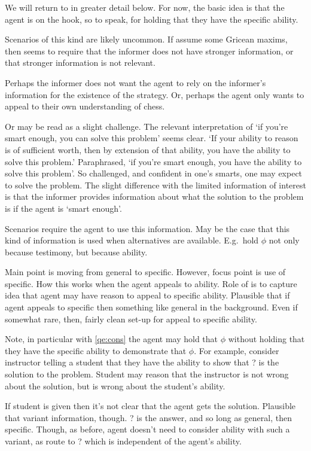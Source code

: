 \begin{note}
  We will return to \GSI in greater detail below.
  For now, the basic idea is that the agent is on the hook, so to speak, for holding that they have the specific ability.

  Scenarios of this kind are likely uncommon.
  If assume some Gricean maxims, then seems to require that the informer does not have stronger information, or that stronger information is not relevant.

  Perhaps the informer does not want the agent to rely on the informer's information for the existence of the strategy.
  Or, perhaps the agent only wants to appeal to their own understanding of chess.

  Or may be read as a slight challenge.
  The relevant interpretation of `if you're smart enough, you can solve this problem' seems clear.
  `If your ability to reason is of sufficient worth, then by extension of that ability, you have the ability to solve this problem.'
  Paraphrased, `if you're smart enough, you have the ability to solve this problem'.
  So challenged, and confident in one's smarts, one may expect to solve the problem.
  The slight difference with the limited information of interest is that the informer provides information about what the solution to the problem is if the agent is `smart enough'.

  Scenarios require the agent to use this information.
  May be the case that this kind of information is used when alternatives are available.
  E.g.\ hold \(\phi\) not only because testimony, but because ability.

  Main point is moving from general to specific.
  However, focus point is use of specific.
  How this works when the agent appeals to ability.
  Role of \GSI{} is to capture idea that agent may have reason to appeal to specific ability.
  Plausible that if agent appeals to specific then something like general in the background.
  Even if somewhat rare, then, fairly clean set-up for appeal to specific ability.

  Note, in particular with \ref{qe:cons} the agent may hold that \(\phi\) without holding that they have the specific ability to demonstrate that \(\phi\).
  For example, consider instructor telling a student that they have the ability to show that ? is the solution to the problem.
  Student may reason that the instructor is not wrong about the solution, but is wrong about the student's ability.

  If student is given \GSI{} then it's not clear that the agent gets the solution.
  Plausible that variant information, though.
  ? is the answer, and so long as general, then specific.
  Though, as before, agent doesn't need to consider ability with such a variant, as route to ? which is independent of the agent's ability.
\end{note}

